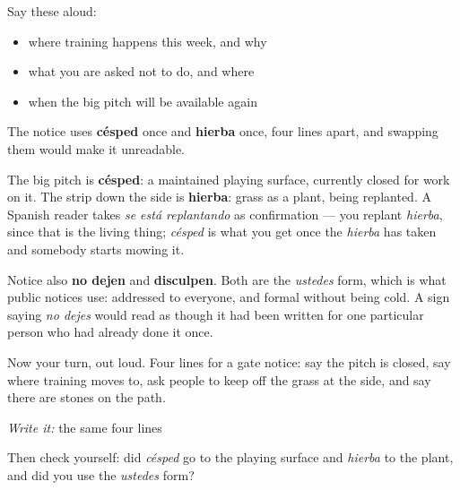 Say these aloud:

\begin{itemize}
\raggedright
  \item where training happens this week, and why
  \item what you are asked not to do, and where
  \item when the big pitch will be available again
\end{itemize}

\begin{culture}
The notice uses \textbf{césped} once and \textbf{hierba} once, four lines apart, and swapping them would make it unreadable.

The big pitch is \textbf{césped}: a maintained playing surface, currently closed for work on it. The strip down the side is \textbf{hierba}: grass as a plant, being replanted. A Spanish reader takes \emph{se está replantando} as confirmation — you replant \emph{hierba}, since that is the living thing; \emph{césped} is what you get once the \emph{hierba} has taken and somebody starts mowing it.

Notice also \textbf{no dejen} and \textbf{disculpen}. Both are the \emph{ustedes} form, which is what public notices use: addressed to everyone, and formal without being cold. A sign saying \emph{no dejes} would read as though it had been written for one particular person who had already done it once.
\end{culture}

\begin{tcolorbox}[breakable,colback=teal!4,colframe=teal!35!black,title={Before you move on}]
Now your turn, out loud. Four lines for a gate notice: say the pitch is closed, say where training moves to, ask people to keep off the grass at the side, and say there are stones on the path.

\emph{Write it:} the same four lines

Then check yourself: did \emph{césped} go to the playing surface and \emph{hierba} to the plant, and did you use the \emph{ustedes} form?
\end{tcolorbox}
